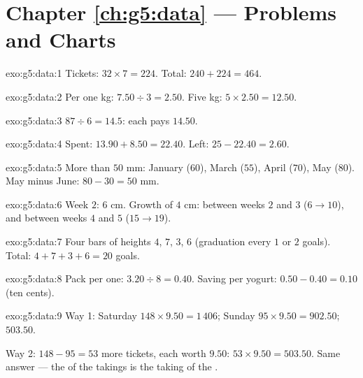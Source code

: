 \section*{Chapter \ref{ch:g5:data} --- Problems and Charts}

\begin{solution}{exo:g5:data:1}
Tickets: $32 \times 7 = 224$. Total: $240 + 224 = 464$.
\end{solution}

\begin{solution}{exo:g5:data:2}
Per one kg: $7.50 \div 3 = 2.50$. Five kg:
$5 \times 2.50 = 12.50$.
\end{solution}

\begin{solution}{exo:g5:data:3}
$87 \div 6 = 14.5$: each pays $14.50$.
\end{solution}

\begin{solution}{exo:g5:data:4}
Spent: $13.90 + 8.50 = 22.40$. Left: $25 - 22.40 = 2.60$.
\end{solution}

\begin{solution}{exo:g5:data:5}
More than $50$ mm: January ($60$), March ($55$), April ($70$), May
($80$). May minus June: $80 - 30 = 50$ mm.
\end{solution}

\begin{solution}{exo:g5:data:6}
Week $2$: $6$ cm. Growth of $4$ cm: between weeks $2$ and $3$
($6 \to 10$), and between weeks $4$ and $5$ ($15 \to 19$).
\end{solution}

\begin{solution}{exo:g5:data:7}
Four bars of heights $4$, $7$, $3$, $6$ (graduation every $1$ or
$2$ goals). Total: $4 + 7 + 3 + 6 = 20$ goals.
\end{solution}

\begin{solution}{exo:g5:data:8}
Pack per one: $3.20 \div 8 = 0.40$. Saving per yogurt:
$0.50 - 0.40 = 0.10$ (ten cents).
\end{solution}

\begin{solution}{exo:g5:data:9}
Way 1: Saturday $148 \times 9.50 = 1\,406$; Sunday
$95 \times 9.50 = 902.50$;  $503.50$.

Way 2: $148 - 95 = 53$ more tickets, each worth $9.50$:
$53 \times 9.50 = 503.50$. Same answer --- the  of the
takings is the taking of the .
\end{solution}

